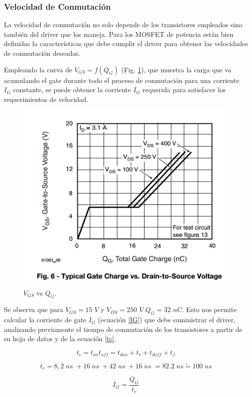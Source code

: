 \documentclass[11pt, a4paper]{article}
\begin{document}
\subsubsection{Velocidad de Conmutación}
La velocidad de conmutación no solo depende de los transistores empleados sino también del driver que los maneja. Para los MOSFET de potencia están bien definidas la características que debe cumplir el driver para obtener las velocidades de conmutación deseadas.

Empleando la curva de $V_{GS} = f(Q_G)$ (Fig. \ref{vgsfqg}), que muestra la carga que va acumulando el gate durante todo el proceso de conmutación para una corriente $I_G$ constante, se puede obtener la corriente $I_G$ requerida para satisfacer los requerimientos de velocidad.

\begin{figure}[h]
	\centering
	\includegraphics[width = 10 cm]{Imagenes/vgsfqg}
	\caption{$V_{GS}$ vs $Q_G$.}
	\label{vgsfqg}
\end{figure}

Se observa que para $V_{GS} = 15$ $V$ y $V_{DS} = 250$ $V$ $Q_G = 32$ $nC$. Esto nos permite calcular la corriente de gate $I_G$ (ecuación \ref{IG}) que debe suministrar el driver, analizando previamente el tiempo de conmutación de los transistores a partir de su hoja de datos y de la ecuación \ref{tc}.

\begin{equation}
t_c = t_{on} t_{off} = t_{don} + t_{r} + t_{doff} + t_f
\label{tc} 
\end{equation}

\[ t_c = 8,2 \; ns\; + 16 \; ns\; + 42 \; ns\; + 16 \; ns\; = 82.2 \; ns \tilde{=} 100 \; ns \]

\begin{equation}
I_G = \frac{Q_G}{t_c} 
\label{IG} 
\end{equation}
\end{document}
